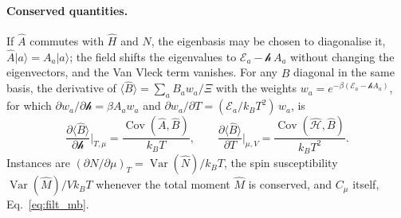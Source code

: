 \documentclass[10pt,a4paper]{article}
\theoremstyle{plain}
\newcommand{\Var}{\operatorname{Var}}
\newcommand{\Cov}{\operatorname{Cov}}
\newcommand{\hfield}{\mathscr{h}}  %
\newcommand{\enrg}{\mathcal{E}}  %
\begin{document}
\paragraph{Conserved quantities.} If $ \hat A $ commutes with $ \hat H $ and
$ \hat N $, the eigenbasis may be chosen to diagonalise it,
$ \hat A|a\rangle = A_a|a\rangle $; the field shifts the eigenvalues to
$ \enrg_a - \hfield\,A_a $ without changing the eigenvectors, and the Van
Vleck term vanishes. For any $ \hat B $ diagonal in the same basis, the
derivative of $\langle\hat B\rangle=\sum_aB_aw_a/\Xi$ with the weights
$w_a=e^{-\beta(\enrg_a-\hfield A_a)}$, for which
$\partial w_a/\partial\hfield=\beta A_aw_a$ and
$\partial w_a/\partial T=(\enrg_a/k_BT^{2})\,w_a$, is
\begin{equation}\label{eq:filt_mb_response}
  \frac{\partial\langle\hat B\rangle}{\partial \hfield}\bigg|_{T,\mu}
  = \frac{\Cov(\hat A, \hat B)}{k_BT} ,
  \qquad
  \frac{\partial\langle\hat B\rangle}{\partial T}\bigg|_{\mu, V}
  = \frac{\Cov(\hat{\mathcal{H}}, \hat B)}{k_BT^{2}} .
\end{equation}
Instances are $ (\partial N/\partial\mu)_T = \Var(\hat N)/k_BT $, the spin
susceptibility $ \Var(\hat M)/Vk_BT $ whenever the total moment $ \hat M $
is conserved, and $ C_\mu $ itself, Eq.~\eqref{eq:filt_mb}.
\end{document}
